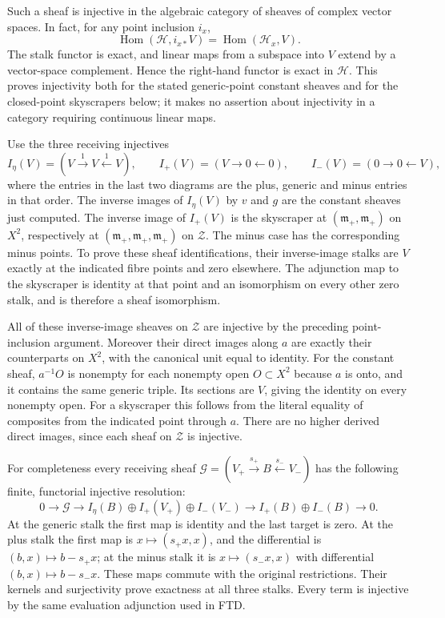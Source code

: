 Such a sheaf is injective in the algebraic category of sheaves of
complex vector spaces. In fact, for any point inclusion \(i_x\), \[
\operatorname{Hom}(\mathcal H,i_{x*}V)=\operatorname{Hom}(\mathcal H_x,V).
\] The stalk functor is exact, and linear maps from a subspace into
\(V\) extend by a vector-space complement. Hence the right-hand functor
is exact in \(\mathcal H\). This proves injectivity both for the stated
generic-point constant sheaves and for the closed-point skyscrapers
below; it makes no assertion about injectivity in a category requiring
continuous linear maps.

Use the three receiving injectives \[
I_\eta(V)=(V\xrightarrow{1}V\xleftarrow{1}V),\qquad
I_+(V)=(V\to0\leftarrow0),\qquad I_-(V)=(0\to0\leftarrow V),
\tag{FSC6.2}
\] where the entries in the last two diagrams are the plus, generic and
minus entries in that order. The inverse images of \(I_\eta(V)\) by
\(v\) and \(g\) are the constant sheaves just computed. The inverse
image of \(I_+(V)\) is the skyscraper at
\((\mathfrak m_+,\mathfrak m_+)\) on \(X^2\), respectively at
\((\mathfrak m_+,\mathfrak m_+,\mathfrak m_+)\) on \(\mathcal Z\). The
minus case has the corresponding minus points. To prove these sheaf
identifications, their inverse-image stalks are \(V\) exactly at the
indicated fibre points and zero elsewhere. The adjunction map to the
skyscraper is identity at that point and an isomorphism on every other
zero stalk, and is therefore a sheaf isomorphism.

All of these inverse-image sheaves on \(\mathcal Z\) are injective by
the preceding point-inclusion argument. Moreover their direct images
along \(a\) are exactly their counterparts on \(X^2\), with the
canonical unit equal to identity. For the constant sheaf, \(a^{-1}O\) is
nonempty for each nonempty open \(O\subset X^2\) because \(a\) is onto,
and it contains the same generic triple. Its sections are \(V\), giving
the identity on every nonempty open. For a skyscraper this follows from
the literal equality of composites from the indicated point through
\(a\). There are no higher derived direct images, since each sheaf on
\(\mathcal Z\) is injective.

For completeness every receiving sheaf
\(\mathcal G=(V_+\xrightarrow{s_+}B\xleftarrow{s_-}V_-)\) has the
following finite, functorial injective resolution: \[
0\to\mathcal G\longrightarrow
I_\eta(B)\oplus I_+(V_+)\oplus I_-(V_-)
\longrightarrow I_+(B)\oplus I_-(B)\to0.
\tag{FSC6.3}
\] At the generic stalk the first map is identity and the last target is
zero. At the plus stalk the first map is \(x\mapsto(s_+x,x)\), and the
differential is \((b,x)\mapsto b-s_+x\); at the minus stalk it is
\(x\mapsto(s_-x,x)\) with differential \((b,x)\mapsto b-s_-x\). These
maps commute with the original restrictions. Their kernels and
surjectivity prove exactness at all three stalks. Every term is
injective by the same evaluation adjunction used in FTD.

